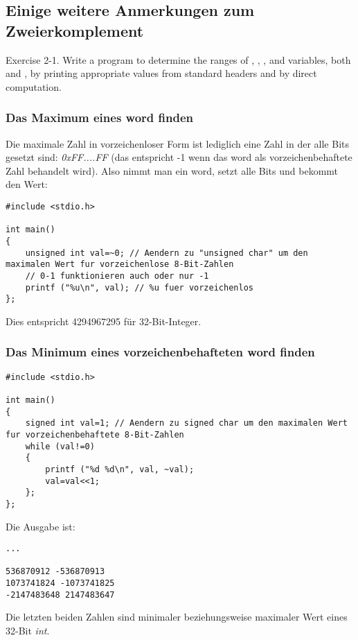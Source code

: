 \subsection{Einige weitere Anmerkungen zum Zweierkomplement}

\epigraph{Exercise 2-1. Write a program to determine the ranges of , , , and 
variables, both  and , by printing appropriate values from standard headers
and by direct computation.}{\KRBook}

\subsubsection{Das Maximum eines \gls{word} finden}
Die maximale Zahl in vorzeichenloser Form ist lediglich eine Zahl in der alle
Bits gesetzt sind: \emph{0xFF....FF}
(das entspricht -1 wenn das \gls{word} als vorzeichenbehaftete Zahl behandelt wird).
Also nimmt man ein \gls{word}, setzt alle Bits und bekommt den Wert:

\begin{lstlisting}[style=customc]
#include <stdio.h>

int main()
{
	unsigned int val=~0; // Aendern zu "unsigned char" um den maximalen Wert fur vorzeichenlose 8-Bit-Zahlen
	// 0-1 funktionieren auch oder nur -1
	printf ("%u\n", val); // %u fuer vorzeichenlos
};
\end{lstlisting}

Dies entspricht 4294967295 für 32-Bit-Integer.

\subsubsection{Das Minimum eines vorzeichenbehafteten \gls{word} finden}



\begin{lstlisting}[style=customc]
#include <stdio.h>

int main()
{
	signed int val=1; // Aendern zu signed char um den maximalen Wert fur vorzeichenbehaftete 8-Bit-Zahlen
	while (val!=0)
	{
		printf ("%d %d\n", val, ~val);
		val=val<<1;
	};
};
\end{lstlisting}

Die Ausgabe ist:

\begin{lstlisting}
...

536870912 -536870913
1073741824 -1073741825
-2147483648 2147483647
\end{lstlisting}

Die letzten beiden Zahlen sind minimaler beziehungsweise maximaler Wert eines 32-Bit \emph{int}.
